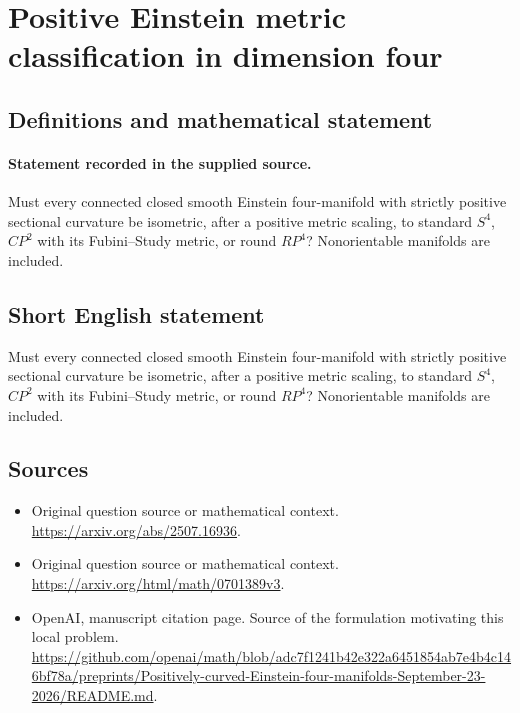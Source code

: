 \documentclass[11pt]{article}
\begin{document}
\section*{Positive Einstein metric classification in dimension four}\label{30007153}
\subsection{Definitions and mathematical statement}
\paragraph{Statement recorded in the supplied source.}
Must every connected closed smooth Einstein four-manifold with strictly positive sectional curvature be isometric, after a positive metric scaling, to standard $S^{4}$, $CP^{2}$ with its Fubini–Study metric, or round $RP^{4}$? Nonorientable manifolds are included.
\subsection{Short English statement}
Must every connected closed smooth Einstein four-manifold with strictly positive sectional curvature be isometric, after a positive metric scaling, to standard $S^{4}$, $CP^{2}$ with its Fubini–Study metric, or round $RP^{4}$? Nonorientable manifolds are included.
\subsection{Sources}
\begin{itemize}
\item[S1] Original question source or mathematical context.
\url{https://arxiv.org/abs/2507.16936}.
\item[S2] Original question source or mathematical context.
\url{https://arxiv.org/html/math/0701389v3}.
\item[S3] OpenAI, manuscript citation page. Source of the formulation motivating this local problem.
\url{https://github.com/openai/math/blob/adc7f1241b42e322a6451854ab7e4b4c146bf78a/preprints/Positively-curved-Einstein-four-manifolds-September-23-2026/README.md}.
\end{itemize}
\end{document}
